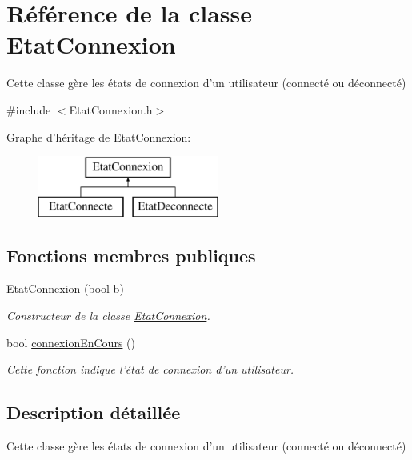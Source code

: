\hypertarget{class_etat_connexion}{\section{Référence de la classe Etat\-Connexion}
\label{class_etat_connexion}
}


Cette classe gère les états de connexion d'un utilisateur (connecté ou déconnecté)  




{\ttfamily \#include $<$Etat\-Connexion.\-h$>$}

Graphe d'héritage de Etat\-Connexion\-:\begin{figure}[H]
\begin{center}
\leavevmode
\includegraphics[height=2.000000cm]{class_etat_connexion}
\end{center}
\end{figure}
\subsection*{Fonctions membres publiques}
\begin{DoxyCompactItemize}
\item 
\hyperlink{class_etat_connexion_ab2f7cac2d3fb8ca6b89a6e9ae65262b5}{Etat\-Connexion} (bool b)
\begin{DoxyCompactList}\small\item\em Constructeur de la classe \hyperlink{class_etat_connexion}{Etat\-Connexion}. \end{DoxyCompactList}\item 
bool \hyperlink{class_etat_connexion_acbb22c19f9b8fb864cd783c51f725c6e}{connexion\-En\-Cours} ()
\begin{DoxyCompactList}\small\item\em Cette fonction indique l'état de connexion d'un utilisateur. \end{DoxyCompactList}\end{DoxyCompactItemize}


\subsection{Description détaillée}
Cette classe gère les états de connexion d'un utilisateur (connecté ou déconnecté) 


